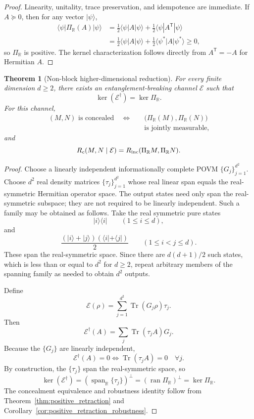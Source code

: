 \documentclass[
aps,pra,twocolumn,10pt,
superscriptaddress,longbibliography,floatfix
]{revtex4-2}
\DeclareMathOperator{\Tr}{Tr}
\newtheorem{theorem}{Theorem}[section]
\begin{document}
\begin{proof}
Linearity, unitality, trace preservation, and idempotence are immediate. If $A\succeq0$, then for any vector $|\psi\rangle$,
\begin{align*}
\langle\psi|\Pi_{\mathbb R}(A)|\psi\rangle
&=
\frac12\langle\psi|A|\psi\rangle
+
\frac12\langle\psi|A^{\mathsf T}|\psi\rangle \\
&=
\frac12\langle\psi|A|\psi\rangle
+
\frac12\langle\psi^*|A|\psi^*\rangle
\ge0,
\end{align*}
so $\Pi_{\mathbb R}$ is positive. The kernel characterization follows directly from $A^{\mathsf T}=-A$ for Hermitian $A$.
\end{proof}

\begin{theorem}[Non-block higher-dimensional reduction]
\label{thm:real_symmetric_reduction}
For every finite dimension $d\ge2$, there exists an entanglement-breaking channel $\mathcal E$ such that
\[
\ker(\mathcal E^\dagger)=\ker\Pi_{\mathbb R}.
\]
For this channel,
\[
\begin{aligned}
(M,N)\text{ is concealed}
\quad\Longleftrightarrow\quad&
\bigl(\Pi_{\mathbb R}(M),
      \Pi_{\mathbb R}(N)\bigr)\\
&\text{is jointly measurable},
\end{aligned}
\]
and
\[
R_c(M,N\mid\mathcal E)
=
R_{\rm inc}(\Pi_{\mathbb R}M,\Pi_{\mathbb R}N).
\]
\end{theorem}

\begin{proof}
Choose a linearly independent informationally complete POVM $\{G_j\}_{j=1}^{d^2}$. Choose $d^2$ real density matrices $\{\tau_j\}_{j=1}^{d^2}$ whose real linear span equals the real-symmetric Hermitian operator space. The output states need only span the real-symmetric subspace; they are not required to be linearly independent. Such a family may be obtained as follows. Take the real symmetric pure states
\[
|i\rangle\langle i|\qquad(1\le i\le d),
\]
and
\[
\frac{(|i\rangle+|j\rangle)(\langle i|+\langle j|)}{2}
\qquad(1\le i<j\le d).
\]
These span the real-symmetric space. Since there are $d(d+1)/2$ such states, which is less than or equal to $d^2$ for $d\ge2$, repeat arbitrary members of the spanning family as needed to obtain $d^2$ outputs.

Define
\[\mathcal E(\rho)=\sum_{j=1}^{d^2}\Tr(G_j\rho)\tau_j.
\]
Then
\[
\mathcal E^\dagger(A)=\sum_j\Tr(\tau_j A)G_j.
\]
Because the $\{G_j\}$ are linearly independent,
\[
\mathcal E^\dagger(A)=0
\iff
\Tr(\tau_j A)=0\quad\forall j.
\]
By construction, the $\{\tau_j\}$ span the real-symmetric space, so
\[
\ker(\mathcal E^\dagger)
=
\left(\operatorname{span}_{\mathbb R}\{\tau_j\}\right)^\perp
=
(\operatorname{ran}\Pi_{\mathbb R})^\perp
=
\ker\Pi_{\mathbb R}.
\]
The concealment equivalence and robustness identity follow from Theorem~\ref{thm:positive_retraction} and Corollary~\ref{cor:positive_retraction_robustness}.
\end{proof}
\end{document}
